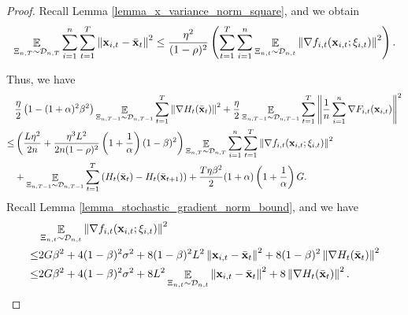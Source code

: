 \documentclass{article}
\begin{document}
\begin{proof}
Recall Lemma \ref{lemma_x_variance_norm_square}, and we obtain
\begin{align}
\nonumber
\mathop{\mathbb{E}}_{ \Xi_{n,T} \sim \mathcal{D}_{n,T} } \sum_{i=1}^n\sum_{t=1}^T \left\lVert{\bf x}_{i,t} - \bar{{\bf x}}_t\right\rVert^2  \le \frac{\eta^2}{(1-\rho)^2} \left(   \sum_{t=1}^T \sum_{i=1}^n \mathop{\mathbb{E}}_{ \Xi_{n,t} \sim \mathcal{D}_{n,t} } \left\lVert\nabla f_{i,t}({\bf x}_{i,t}; \xi_{i,t})\right\rVert^2  \right).
\end{align}

Thus, we have
\begin{align}
\nonumber
& \frac{\eta}{2} \left(  1-(1+\alpha)^2\beta^2  \right) \mathop{\mathbb{E}}_{ \Xi_{n,T-1} \sim \mathcal{D}_{n,T-1} }\sum_{t=1}^T\left\lVert\nabla H_t(\bar{{\bf x}}_t)\right\rVert^2 + \frac{\eta}{2}  \mathop{\mathbb{E}}_{ \Xi_{n,T-1} \sim \mathcal{D}_{n,T-1} }\sum_{t=1}^T\left\lVert\frac{1}{n}\sum_{i=1}^n \nabla F_{i,t}({\bf x}_{i,t})\right\rVert^2 \\ \nonumber 
\le &  \left( \frac{L\eta^2}{2n} + \frac{\eta^3 L^2}{2n(1-\rho)^2} \left( 1+\frac{1}{\alpha} \right)(1-\beta)^2  \right) \mathop{\mathbb{E}}_{ \Xi_{n,T} \sim \mathcal{D}_{n,T} }\sum_{i=1}^n \sum_{t=1}^T\left\lVert \nabla f_{i,t}({\bf x}_{i,t};\xi_{i,t})\right\rVert^2 \\ \nonumber
& + \mathop{\mathbb{E}}_{ \Xi_{n,T-1} \sim \mathcal{D}_{n,T-1} } \sum_{t=1}^T \left(  H_t(\bar{{\bf x}}_t) -  H_t(\bar{{\bf x}}_{t+1})  \right) + \frac{T \eta \beta^2}{2} (1+\alpha) \left( 1+\frac{1}{\alpha} \right)  G.
\end{align} Recall Lemma \ref{lemma_stochastic_gradient_norm_bound}, and we have
\begin{align}
\nonumber
& \mathop{\mathbb{E}}_{ \Xi_{n,t} \sim \mathcal{D}_{n,t} }\left\lVert \nabla f_{i,t}({\bf x}_{i,t};\xi_{i,t})\right\rVert^2 \\ \nonumber
\le & 2G\beta^2  +  4(1-\beta)^2 \sigma^2 +  8(1-\beta)^2 L^2 \left\lVert {\bf x}_{i,t} - \bar{{\bf x}}_t \right\rVert^2 + 8(1-\beta)^2 \left\lVert\nabla H_t(\bar{{\bf x}}_t)\right\rVert^2 \\ \nonumber
\le & 2G\beta^2  +  4(1-\beta)^2 \sigma^2 +  8 L^2 \mathop{\mathbb{E}}_{ \Xi_{n,t} \sim \mathcal{D}_{n,t} }\left\lVert {\bf x}_{i,t} - \bar{{\bf x}}_t \right\rVert^2 + 8 \left\lVert\nabla H_t(\bar{{\bf x}}_t)\right\rVert^2.
\end{align}


\end{proof}
\end{document}

